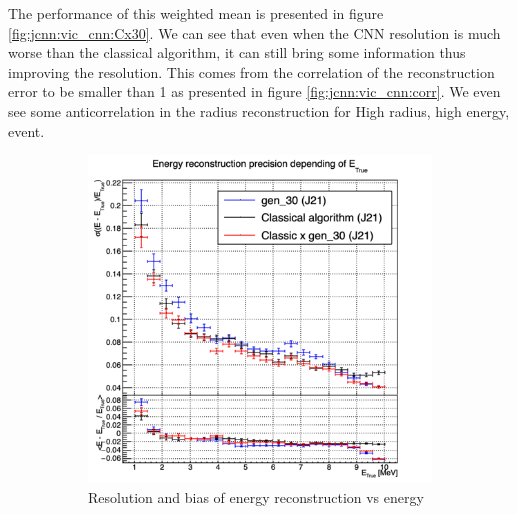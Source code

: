 \documentclass[../main.tex]{subfiles}
\begin{document}
The performance of this weighted mean is presented in figure \ref{fig:jcnn:vic_cnn:Cx30}. We can see that even when the CNN resolution is much worse than the classical algorithm, it can still bring some information thus improving the resolution. This comes from the correlation of the reconstruction error to be smaller than 1 as presented in figure \ref{fig:jcnn:vic_cnn:corr}. We even see some anticorrelation in the radius reconstruction for High radius, high energy, event.


\begin{figure}[ht]
  \centering
  \begin{subfigure}[t]{0.32\linewidth}
    \centering
    \includegraphics[width=\linewidth]{images/jcnn/vic_cnn/multi_vic_cnn_Cx30_MESBvETC.png}
    \caption{Resolution and bias of energy reconstruction vs energy}
    \label{fig:jcnn:vic_cnn:multi_vic_cnn_Cx30_MESBvETC}
  \end{subfigure}
  \begin{subfigure}[t]{0.32\linewidth}
    \centering

\end{subfigure}
\end{figure}
\end{document}
